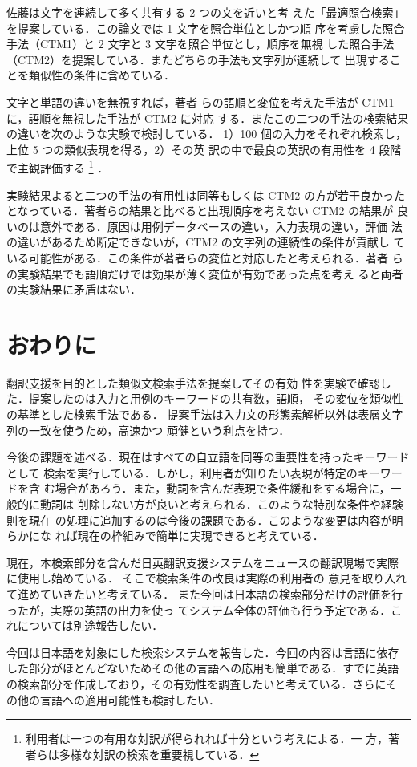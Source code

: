 佐藤\cite{Sato93}は文字を連続して多く共有する 2 つの文を近いと考
えた「最適照合検索」を提案している．この論文では 1 文字を照合単位としかつ順
序を考慮した照合手法（CTM1）と 2 文字と 3 文字を照合単位とし，順序を無視
した照合手法（CTM2）を提案している．またどちらの手法も文字列が連続して
出現することを類似性の条件に含めている．

文字と単語の違いを無視すれば，著者
らの語順と変位を考えた手法が CTM1 に，語順を無視した手法が CTM2 に対応
する．またこの二つの手法の検索結果の違いを次のような実験で検討している．
1）100 個の入力をそれぞれ検索し，上位 5 つの類似表現を得る，2）その英
訳の中で最良の英訳の有用性を 4 段階で主観評価する
\footnote{利用者は一つの有用な対訳が得られれば十分という考えによる．一
方，著者らは多様な対訳の検索を重要視している．}
．

実験結果よると二つの手法の有用性は同等もしくは CTM2 の方が若干良かった
となっている．著者らの結果と比べると出現順序を考えない CTM2 の結果が
良いのは意外である．原因は用例データベースの違い，入力表現の違い，評価
法の違いがあるため断定できないが，CTM2 の文字列の連続性の条件が貢献し
ている可能性がある．この条件が著者らの変位と対応したと考えられる．著者
らの実験結果でも語順だけでは効果が薄く変位が有効であった点を考え
ると両者の実験結果に矛盾はない．
\section{おわりに}
\label{sec:ketsuron}
翻訳支援を目的とした類似文検索手法を提案してその有効
性を実験で確認した．提案したのは入力と用例のキーワードの共有数，語順，
その変位を類似性の基準とした検索手法である．
提案手法は入力文の形態素解析以外は表層文字列の一致を使うため，高速かつ
頑健という利点を持つ．

今後の課題を述べる．現在はすべての自立語を同等の重要性を持ったキーワードとして
検索を実行している．しかし，利用者が知りたい表現が特定のキーワードを含
む場合があろう．また，動詞を含んだ表現で条件緩和をする場合に，一般的に動詞は
削除しない方が良いと考えられる．このような特別な条件や経験則を現在
の処理に追加するのは今後の課題である．このような変更は内容が明らかにな
れば現在の枠組みで簡単に実現できると考えている．

現在，本検索部分を含んだ日英翻訳支援システムをニュースの翻訳現場で実際
に使用し始めている．
そこで検索条件の改良は実際の利用者の
意見を取り入れて進めていきたいと考えている．
また今回は日本語の検索部分だけの評価を行ったが，実際の英語の出力を使っ
てシステム全体の評価も行う予定である．これについては別途報告したい．

今回は日本語を対象にした検索システムを報告した．今回の内容は言語に依存
した部分がほとんどないためその他の言語への応用も簡単である．すでに英語
の検索部分を作成しており，その有効性を調査したいと考えている．さらにそ
の他の言語への適用可能性も検討したい．

